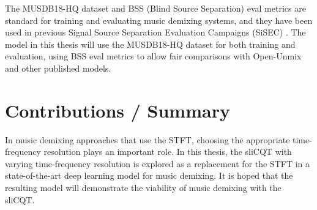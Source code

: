 \documentclass[letter,12pt]{article}
\begin{document}
The MUSDB18-HQ dataset \parencite{musdb18hq} and BSS (Blind Source Separation) eval metrics \parencite{bss} are standard for training and evaluating music demixing systems, and they have been used in previous Signal Source Separation Evaluation Campaigns (SiSEC) \parencite{sisec2018}. The model in this thesis will use the MUSDB18-HQ dataset for both training and evaluation, using BSS eval metrics to allow fair comparisons with Open-Unmix and other published models.

\section{Contributions / Summary}

In music demixing approaches that use the STFT, choosing the appropriate time-frequency resolution plays an important role. In this thesis, the sliCQT with varying time-frequency resolution is explored as a replacement for the STFT in a state-of-the-art deep learning model for music demixing. It is hoped that the resulting model will demonstrate the viability of music demixing with the sliCQT.

\vfill
\clearpage %


\begingroup
{}
\setlength\bibitemsep{0.015em}
\printbibheading[title={References},heading=bibnumbered]
\printbibliography[heading=none]
\endgroup

\vfill
\clearpage %
\end{document}
